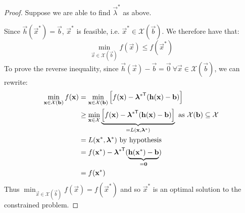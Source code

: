 \documentclass[../main.tex]{subfiles}
\begin{document}
\begin{proof}
  Suppose we are able to find $\vec{\lambda}^{*}$ as above.

  Since $\vec{h}(\vec{x}^{*}) = \vec{b}$, $\vec{x}^{*}$ is feasible, i.e. $\vec{x}^{*} \in \mathcal{X}(\vec{b})$.
  We therefore have that:
  \[
    \min_{\vec{x} \in \mathcal{X}(\vec{b})} f(\vec{x}) \leq f(\vec{x}^{*})
  \]
  To prove the reverse inequality, since $\vec{h}(\vec{x}) - \vec{b} = \vec{0}\ \forall \vec{x} \in \mathcal{X}(\vec{b})$, we can rewrite:
  \begin{align*}
    \min_{\mathbf{\bm{x}} \in \mathcal{X}(\mathbf{\bm{b}})} f(\mathbf{\bm{x}}) &= \min_{\mathbf{\bm{x}} \in \mathcal{X}(\mathbf{\bm{b}})} \left[f(\mathbf{\bm{x}}) - {\mathbf{\bm{\lambda}}^{*}}^{{\mkern-1.5mu\mathsf{T}}} (\mathbf{\bm{h}}(\mathbf{\bm{x}}) - \mathbf{\bm{b}})\right] \\
                                                       &\geq \min_{\mathbf{\bm{x}} \in \mathcal{X}} \underbrace{\left[f(\mathbf{\bm{x}}) - {\mathbf{\bm{\lambda}}^{*}}^{{\mkern-1.5mu\mathsf{T}}} (\mathbf{\bm{h}}(\mathbf{\bm{x}}) - \mathbf{\bm{b}})\right]}_{=L(\mathbf{\bm{x}}, \mathbf{\bm{\lambda}}^{*})} \text{ as $\mathcal{X}(\mathbf{\bm{b}}) \subseteq \mathcal{X}$} \\
                                                       &= L(\mathbf{\bm{x}}^{*}, \mathbf{\bm{\lambda}}^{*}) \text{ by hypothesis} \\
                                                       &= f(\mathbf{\bm{x}}^{*}) - {\mathbf{\bm{\lambda}}^{*}}^{{\mkern-1.5mu\mathsf{T}}}(\underbrace{\mathbf{\bm{h}}(\mathbf{\bm{x}}^{*}) - \mathbf{\bm{b}}}_{= \mathbf{\bm{0}}}) \\
                                                       &= f(\mathbf{\bm{x}}^{*})
  \end{align*}
  Thus $\min_{\vec{x} \in \mathcal{X}(\vec{b})} f(\vec{x}) = f(\vec{x}^{*})$ and so $\vec{x}^{*}$ is an optimal solution to the constrained problem.
\end{proof}
\end{document}
